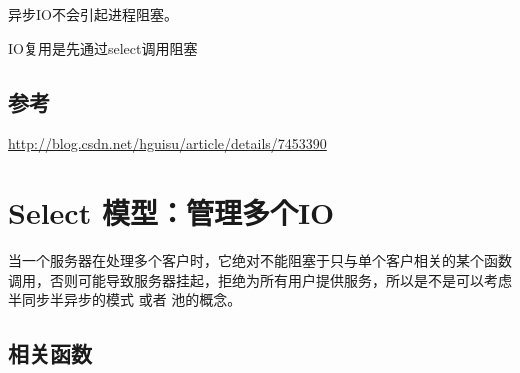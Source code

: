 \documentclass[UTF8,a4paper,8pt]{ctexbook}
\begin{document}
			异步IO不会引起进程阻塞。
			
			IO复用是先通过select调用阻塞
		\subsection{参考}\url{http://blog.csdn.net/hguisu/article/details/7453390}
	\section{Select 模型：管理多个IO}
		当一个服务器在处理多个客户时，它绝对不能阻塞于只与单个客户相关的某个函数调用，否则可能导致服务器挂起，拒绝为所有用户提供服务，所以是不是可以考虑半同步半异步的模式 或者 池的概念。
		\subsection{相关函数}
\end{document}
